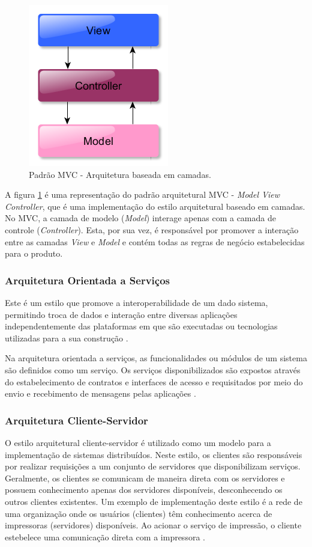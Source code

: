 \begin{figure}[htb]
\centering
\includegraphics[scale=0.5]{figuras/modelo_mvc.PNG}
\caption{Padrão MVC - Arquitetura baseada em camadas.}
\label{modelo_mvc}
\end{figure}

A figura \ref{modelo_mvc} é uma representação do padrão arquitetural MVC - \textit{Model View Controller}, que é uma implementação do estilo arquitetural baseado em camadas. No MVC, a camada de modelo (\textit{Model}) interage apenas com a camada de controle (\textit{Controller}). Esta, por sua vez, é responsável por promover a interação entre as camadas \textit{View} e \textit{Model} e contém todas as regras de negócio estabelecidas para o produto.

\subsubsection{Arquitetura Orientada a Serviços}

Este é um estilo que promove a interoperabilidade de um dado sistema, permitindo troca de dados e interação entre diversas aplicações independentemente das plataformas em que são executadas ou tecnologias utilizadas para a sua construção \cite{oqueesoa_2010}.

Na arquitetura orientada a serviços, as funcionalidades ou módulos de um sistema são definidos como um serviço. Os serviços disponibilizados são expostos através do estabelecimento de contratos e interfaces de acesso e requisitados por meio do envio e recebimento de mensagens pelas aplicações \cite{oqueesoa_2010}.

\subsubsection{Arquitetura Cliente-Servidor}
O estilo arquitetural cliente-servidor é utilizado como um modelo para a implementação de sistemas distribuídos. Neste estilo, os clientes são responsáveis por realizar requisições a um conjunto de servidores que disponibilizam serviços. Geralmente, os clientes se comunicam de maneira direta com os servidores e possuem conhecimento apenas dos servidores disponíveis, desconhecendo os outros clientes existentes. Um exemplo de implementação deste estilo é a rede de uma organização onde os usuários (clientes) têm conhecimento acerca de impressoras (servidores) disponíveis. Ao acionar o serviço de impressão, o cliente estebelece uma comunicação direta com a impressora \cite{sommerville2008engenharia}.


